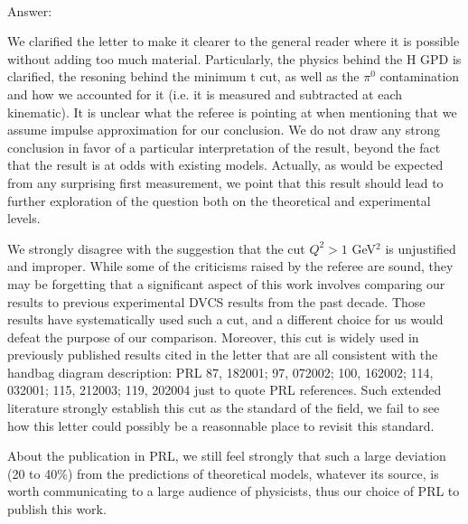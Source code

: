 \documentclass{article}
\begin{document}
\noindent \\
Answer:

We clarified the letter to make it clearer to the general reader where it is possible without adding too much material. Particularly, the physics behind the H GPD is clarified, the resoning behind the minimum t cut, as well as the $\pi^0$ contamination and how we accounted for it (i.e. it is measured and subtracted at each kinematic). It is unclear what the referee is pointing at when mentioning that we assume impulse approximation for our conclusion. We do not draw any strong conclusion in favor of a particular interpretation of the result, beyond the fact that the result is at odds with existing models. Actually, as would be expected from any surprising first measurement, we point that this result should lead to further exploration of the question both on the theoretical and experimental levels. 

We strongly disagree with the suggestion that the cut $Q^2 > 1$ GeV$^2$ is unjustified and improper. While some of the criticisms raised by the referee are sound, they may be forgetting that a significant aspect of this work involves comparing our results to previous experimental DVCS results from the past decade. Those results have systematically used such a cut, and a different choice for us would defeat the purpose of our comparison. Moreover, this cut is widely used in previously published results cited in the letter that are all consistent with the handbag diagram description: PRL 87, 182001; 97, 072002; 100, 162002; 114, 032001; 115, 212003; 119, 202004 just to quote PRL references. Such extended literature strongly establish this cut as the standard of the field, we fail to see how this letter could possibly be a reasonnable place to revisit this standard. 

About the publication in PRL, we still feel strongly that such a large deviation (20 to 40\%) from the predictions of theoretical models, whatever its source, is worth communicating to a large audience of physicists, thus our choice of PRL to publish this work.
\end{document}
